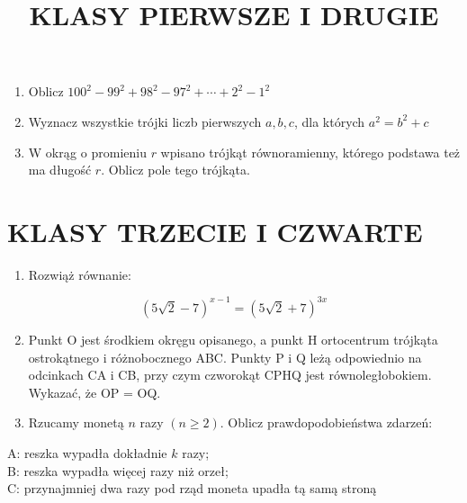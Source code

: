 \documentclass[10pt]{article}
\title{KLASY PIERWSZE I DRUGIE }
\author{}
\date{}
\begin{document}
\maketitle
\begin{enumerate}
  \item Oblicz \(100^{2}-99^{2}+98^{2}-97^{2}+\cdots+2^{2}-1^{2}\)
  \item Wyznacz wszystkie trójki liczb pierwszych \(a, b, c\), dla których \(a^{2}=b^{2}+c\)
  \item W okrąg o promieniu \(r\) wpisano trójkąt równoramienny, którego podstawa też ma długość \(r\). Oblicz pole tego trójkąta.
\end{enumerate}

\section*{KLASY TRZECIE I CZWARTE}
\begin{enumerate}
  \item Rozwiąż równanie:
\end{enumerate}

\[
(5 \sqrt{2}-7)^{x-1}=(5 \sqrt{2}+7)^{3 x}
\]

\begin{enumerate}
  \setcounter{enumi}{1}
  \item Punkt O jest środkiem okręgu opisanego, a punkt H ortocentrum trójkąta ostrokątnego i różnobocznego ABC. Punkty P i Q leżą odpowiednio na odcinkach CA i CB, przy czym czworokąt CPHQ jest równoległobokiem. Wykazać, że OP = OQ.
  \item Rzucamy monetą \(n\) razy \((n \geq 2)\). Oblicz prawdopodobieństwa zdarzeń:
\end{enumerate}

A: reszka wypadła dokładnie \(k\) razy;\\
B: reszka wypadła więcej razy niż orzeł;\\
C: przynajmniej dwa razy pod rząd moneta upadła tą samą stroną
\end{document}
